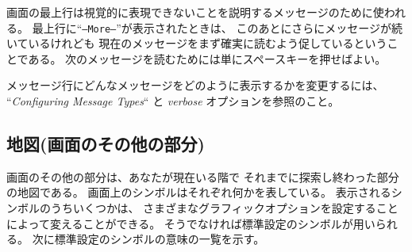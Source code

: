 画面の最上行は視覚的に表現できないことを説明するメッセージのために使われる。
最上行に``{\tt --More--}''が表示されたときは、
このあとにさらにメッセージが続いているけれども
現在のメッセージをまず確実に読むよう促しているということである。
次のメッセージを読むためには単にスペースキーを押せばよい。

メッセージ行にどんなメッセージをどのように表示するかを変更するには、
``{\it Configuring Message Types\/}`` と
{\it verbose\/} オプションを参照のこと。

\subsection*{地図(画面のその他の部分)}

画面のその他の部分は、あなたが現在いる階で
それまでに探索し終わった部分の地図である。
画面上のシンボルはそれぞれ何かを表している。
表示されるシンボルのうちいくつかは、
さまざまなグラフィックオプションを設定することによって変えることができる。
そうでなければ標準設定のシンボルが用いられる。
次に標準設定のシンボルの意味の一覧を示す。

